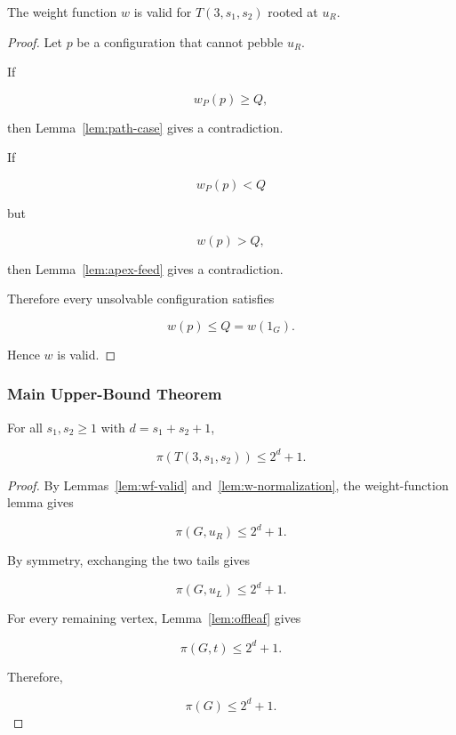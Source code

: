 \begin{lemma}[Validity of $w$]
\label{lem:wf-valid}

The weight function $w$ is valid for
$T(3,s_1,s_2)$ rooted at $u_R$.

\end{lemma}



\begin{proof}

Let $p$ be a configuration that cannot pebble $u_R$.

If

\[
w_P(p)\ge Q,
\]

then Lemma~\ref{lem:path-case} gives a contradiction.

If

\[
w_P(p)<Q
\]

but

\[
w(p)>Q,
\]

then Lemma~\ref{lem:apex-feed} gives a contradiction.

Therefore every unsolvable configuration satisfies

\[
w(p)\le Q=w(1_G).
\]

Hence $w$ is valid.

\end{proof}




\subsubsection{Main Upper-Bound Theorem}


\begin{theorem}
\label{thm:upper-bound}

For all $s_1,s_2\ge1$ with
$d=s_1+s_2+1$,

\[
\pi(T(3,s_1,s_2))\le2^d+1 .
\]

\end{theorem}



\begin{proof}

By Lemmas~\ref{lem:wf-valid} and~\ref{lem:w-normalization},
the weight-function lemma gives

\[
\pi(G,u_R)\le2^d+1 .
\]


By symmetry, exchanging the two tails gives

\[
\pi(G,u_L)\le2^d+1 .
\]


For every remaining vertex,
Lemma~\ref{lem:offleaf} gives

\[
\pi(G,t)\le2^d+1 .
\]


Therefore,

\[
\pi(G)\le2^d+1 .
\]

\end{proof}




